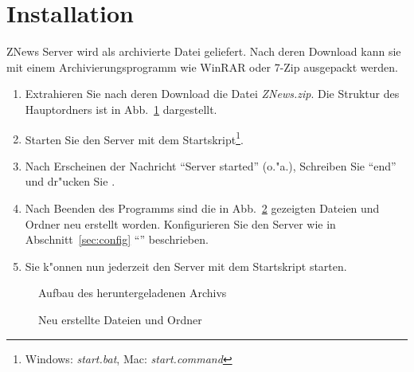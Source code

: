 

\Begin


\newpage
\tableofcontents
\newpage

\section{Installation}

ZNews Server wird als archivierte Datei geliefert.
Nach deren Download kann sie mit einem Archivierungsprogramm
wie WinRAR oder 7-Zip ausgepackt werden.

\begin{enumerate}
    \item Extrahieren Sie nach deren Download die Datei \emph{ZNews.zip}.
    Die Struktur des Hauptordners ist in Abb.~\ref{fig:dirtree1} dargestellt.
    \item Starten Sie den Server mit dem Startskript\footnote{%
    Windows: \emph{start.bat}, Mac: \emph{start.command}}.
    \item Nach Erscheinen der Nachricht ``Server started'' (o."a.),
    Schreiben Sie ``end'' und dr"ucken Sie .
    \item Nach Beenden des Programms sind die in Abb.~\ref{fig:dirtree2}
    gezeigten Dateien und Ordner neu erstellt worden.
    Konfigurieren Sie den Server wie in Abschnitt~\ref{sec:config} ``'' beschrieben.
    \item Sie k"onnen nun jederzeit den Server mit dem Startskript starten.
\end{enumerate}

\begin{figure}[htb]
    \caption{\label{fig:dirtree1}Aufbau des heruntergeladenen Archivs}
\end{figure}

\begin{figure}[htb]
    \caption{\label{fig:dirtree2}Neu erstellte Dateien und Ordner}
\end{figure}


